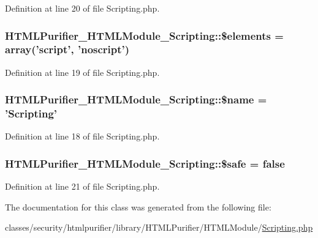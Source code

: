 Definition at line 20 of file Scripting.\+php.

\hypertarget{classHTMLPurifier__HTMLModule__Scripting_a7e596ea05b36930db0fd8489e568c012}{
\subsubsection[{\$elements}]{\setlength{\rightskip}{0pt plus 5cm}H\+T\+M\+L\+Purifier\+\_\+\+H\+T\+M\+L\+Module\+\_\+\+Scripting\+::\$elements = array('script', 'noscript')}}\label{classHTMLPurifier__HTMLModule__Scripting_a7e596ea05b36930db0fd8489e568c012}


Definition at line 19 of file Scripting.\+php.

\hypertarget{classHTMLPurifier__HTMLModule__Scripting_a4e135ce2197c4d38cae6293ff410fc70}{
\subsubsection[{\$name}]{\setlength{\rightskip}{0pt plus 5cm}H\+T\+M\+L\+Purifier\+\_\+\+H\+T\+M\+L\+Module\+\_\+\+Scripting\+::\$name = 'Scripting'}}\label{classHTMLPurifier__HTMLModule__Scripting_a4e135ce2197c4d38cae6293ff410fc70}


Definition at line 18 of file Scripting.\+php.

\hypertarget{classHTMLPurifier__HTMLModule__Scripting_a3d7746230db0a4bf2c093adc65e708fb}{
\subsubsection[{\$safe}]{\setlength{\rightskip}{0pt plus 5cm}H\+T\+M\+L\+Purifier\+\_\+\+H\+T\+M\+L\+Module\+\_\+\+Scripting\+::\$safe = false}}\label{classHTMLPurifier__HTMLModule__Scripting_a3d7746230db0a4bf2c093adc65e708fb}


Definition at line 21 of file Scripting.\+php.



The documentation for this class was generated from the following file\+:\begin{DoxyCompactItemize}
\item 
classes/security/htmlpurifier/library/\+H\+T\+M\+L\+Purifier/\+H\+T\+M\+L\+Module/\hyperlink{Scripting_8php}{Scripting.\+php}\end{DoxyCompactItemize}
